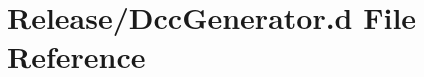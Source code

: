 \hypertarget{Release_2DccGenerator_8d}{}\section{Release/\+Dcc\+Generator.d File Reference}
\label{Release_2DccGenerator_8d}
